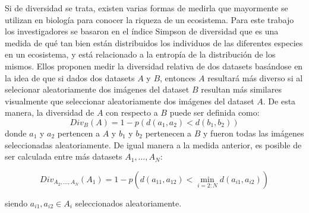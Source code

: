 Si de diversidad se trata, existen varias formas de medirla que mayormente se utilizan en biología para conocer la riqueza de un ecosistema. Para este trabajo los investigadores se basaron en el índice Simpson de diversidad que es una medida de qué tan bien están distribuidos los individuos de las diferentes especies en un ecosistema, y está relacionado a la entropía de la distribución de los mismos. Ellos proponen medir la diversidad relativa de dos datasets basándose en la idea de que si dados dos datasets \(A\) y \(B\), entonces \(A\) resultará más diverso si al selecionar aleatoriamente dos imágenes del dataset \(B\) resultan más similares visualmente que seleccionar aleatoriamente dos imágenes del dataset \(A\). De esta manera, la diversidad de \(A\) con respecto a \(B\) puede ser definida como:
 \begin{equation}
 {Div}_{B}(A)=1-p\left(d\left(a_{1}, a_{2}\right)<d\left(b_{1}, b_{2}\right)\right)
 \end{equation}
  donde \(a_{1}\) y \(a_{2}\) pertencen a \(A\) y  \(b_{1}\) y \(b_{2}\) pertenecen a \(B\) y fueron todas las imágenes seleccionadas aleatoriamente. De igual manera a la medida anterior, es posible de ser calculada entre más datasets \({A_{1}, \ldots, A_{N}}\):
  
  \begin{equation}
  {Div}_{A_{2}, \ldots, A_{N}}\left(A_{1}\right)=1-p\left(d\left(a_{11}, a_{12}\right)<\min _{i=2: N} d\left(a_{i 1}, a_{i 2}\right)\right)
  \end{equation}
  
  siendo \(a_{i 1}, a_{i 2} \in A_{i}\) seleccionados aleatoriamente.
  
